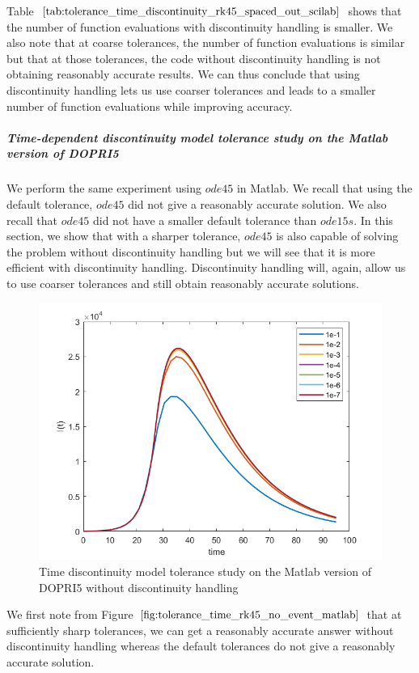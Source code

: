 Table $\ref{tab:tolerance_time_discontinuity_rk45_spaced_out_scilab}$ shows that the number of function evaluations with discontinuity handling is smaller. We also note that at coarse tolerances, the number of function evaluations is similar but that at those tolerances, the code without discontinuity handling is not obtaining reasonably accurate results. We can thus conclude that using discontinuity handling lets us use coarser tolerances and leads to a smaller number of function evaluations while improving accuracy.


\subparagraph{Time-dependent discontinuity model tolerance study on the Matlab version of DOPRI5}
We perform the same experiment using $ode45$ in Matlab. We recall that using the default tolerance, $ode45$ did not give a reasonably accurate solution. We also recall that $ode45$ did not have a smaller default tolerance than $ode15s$. In this section, we show that with a sharper tolerance, $ode45$ is also capable of solving the problem without discontinuity handling but we will see that it is more efficient with discontinuity handling. Discontinuity handling will, again, allow us to use coarser tolerances and still obtain reasonably accurate solutions.

\begin{figure}[H]
\centering
\includegraphics[width=0.7\linewidth]{./figures/tolerance_time_rk45_no_event_matlab}
\caption{Time discontinuity model tolerance study on the Matlab version of DOPRI5 without discontinuity handling}
\label{fig:tolerance_time_rk45_no_event_matlab}
\end{figure}

We first note from Figure $\ref{fig:tolerance_time_rk45_no_event_matlab}$ that at sufficiently sharp tolerances, we can get a reasonably accurate answer without discontinuity handling whereas the default tolerances do not give a reasonably accurate solution.

